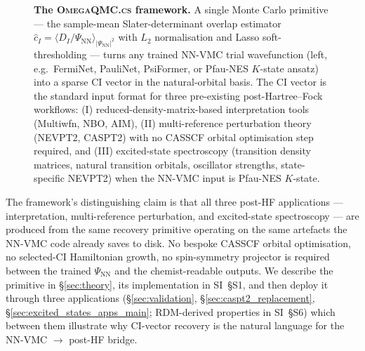 \documentclass[journal=jctcce,manuscript=article,layout=traditional]{achemso}
\begin{document}
\begin{figure}[t]
\caption{\textbf{The \textsc{OmegaQMC.cs} framework.} A single Monte
Carlo primitive --- the sample-mean Slater-determinant overlap
estimator $\widehat{c}_I = \langle D_I/\Psi_{\mathrm{NN}}
\rangle_{|\Psi_{\mathrm{NN}}|^2}$ with $L_2$ normalisation and Lasso
soft-thresholding --- turns any trained NN-VMC trial wavefunction
(left, e.g.\ FermiNet, PauliNet, PsiFormer, or Pfau-NES $K$-state
ansatz) into a sparse CI vector in the natural-orbital basis. The
CI vector is the standard input format for three pre-existing
post-Hartree--Fock workflows: (I) reduced-density-matrix-based
interpretation tools (Multiwfn, NBO, AIM), (II) multi-reference
perturbation theory (NEVPT2, CASPT2) with no CASSCF orbital
optimisation step required, and (III) excited-state spectroscopy
(transition density matrices, natural transition orbitals, oscillator
strengths, state-specific NEVPT2) when the NN-VMC input is Pfau-NES
$K$-state.}
\label{fig:framework}
\end{figure}

The framework's distinguishing claim is that all three post-HF
applications --- interpretation, multi-reference perturbation,
and excited-state spectroscopy --- are produced from the same
recovery primitive operating on the same artefacts the NN-VMC code
already saves to disk. No bespoke CASSCF orbital optimisation, no
selected-CI Hamiltonian growth, no spin-symmetry projector is required
between the trained $\Psi_{\mathrm{NN}}$ and the chemist-readable
outputs. We describe the primitive in \S\ref{sec:theory}, its
implementation in SI~\S S1, and then deploy
it through three applications (\S\ref{sec:validation},
\S\ref{sec:caspt2_replacement}, \S\ref{sec:excited_states_apps_main};
RDM-derived properties in SI~\S S6) which between them
illustrate why CI-vector recovery is the natural language for the
NN-VMC $\to$ post-HF bridge.
\end{document}
